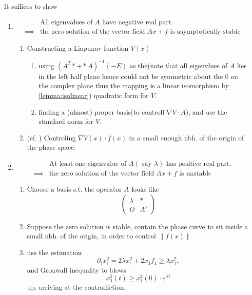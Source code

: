 \documentclass{tufte-handout}
\newcommand\n[1]{\lVert#1\rVert}
\begin{document}
\begin{sketchproof} 
	It suffices to show \\
\begin{enumerate}[label=\textbf{Case \Roman*:}]
	\item 
		\begin{align*} & \text{All eigenvalues of } A \text{ have negative real part}.\\ \implies & \text{the zero solution of the vector field } Ax+f \text{ is asymptotically stable}
 \end{align*}
\begin{enumerate}[label=\textbf{Step \Roman*:},leftmargin=0.5cm]
	\item Constructing a Liapunov function $V(x)$
\begin{enumerate}[label=\textbf{Method \Roman*:},leftmargin=1.0cm]
	\item using $(A^T * + * A)^{-1}(-E)$ as the(note that all eigenvlues of $A$ lies in the left half plane hence could not be symmetric about the 0 on the complex plane thus the mapping is a linear isomorphism by \ref{lemma:isolinear}) quadratic form for $V$.
	\item finding a (almost) proper basis(to controll $\nabla V \cdot A$), and use the standard norm for $V$.
\end{enumerate}
\item (cf. \cite{arnold1992ordinary}) Controling $\nabla V(x) \cdot f(x)$ in a small enough nbh. of the origin of the phase space.
\end{enumerate}
\item 
			\begin{align*} & \text{At least one eigenvalue of } A(\text{ say } \lambda) \text{ has positive real part}.\\ \implies & \text{the zero solution of the vector field } Ax+f \text{ is unstable}
 \end{align*}
\begin{enumerate}[label=\textbf{Step \Roman*:},leftmargin=0.5cm]
	\item Choose a basis s.t. the operator $A$ looks like 
		\[ 
			\begin{pmatrix} 
				\lambda & * \\
				O & A'
			\end{pmatrix}
		\]
	\item Suppose the zero solution is stable, contain the phase curve to sit inside a small nbh. of the origin, in order to control $\n{f(x)}$
	\item use the estimation \[ \partial_t x_1^2 = 2\lambda x_1^2 + 2x_1f_1 \geq \lambda x_1^2, \] and Gronwall inequality to blows \[ x_1^2(t) \geq x_1^2(0) \cdot e^{\lambda t} \] up, arriving at the contradiction.
	\end{enumerate}
\end{enumerate}
\end{sketchproof}
\end{document}
